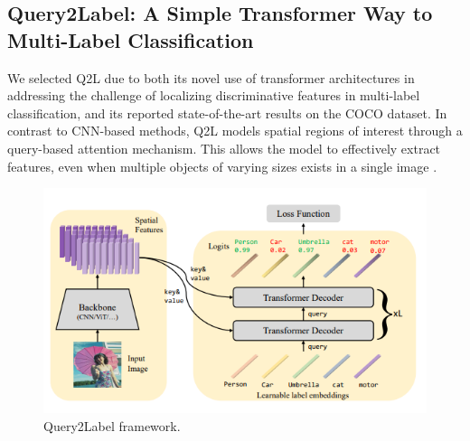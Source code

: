 \documentclass[lettersize,journal]{IEEEtran}
\begin{document}
\subsection{Query2Label: A Simple Transformer Way to Multi-Label Classification}
\label{sec:q2l_method}
We selected Q2L \cite{Query2Label} due to both its novel use of transformer architectures in addressing the challenge of localizing discriminative features in multi-label classification, and its reported state-of-the-art results on the COCO dataset. In contrast to CNN-based methods, Q2L models spatial regions of interest through a query-based attention mechanism. This allows the model to effectively extract features, even when multiple objects of varying sizes exists in a single image \cite{Query2Label}.

\begin{figure}[t]
    \centering
    \includegraphics[width=.8\linewidth]{images/q2l_framework.PNG}
    \caption{Query2Label framework.}
    \label{fig:q2l_framework}
\end{figure}


\end{document}
